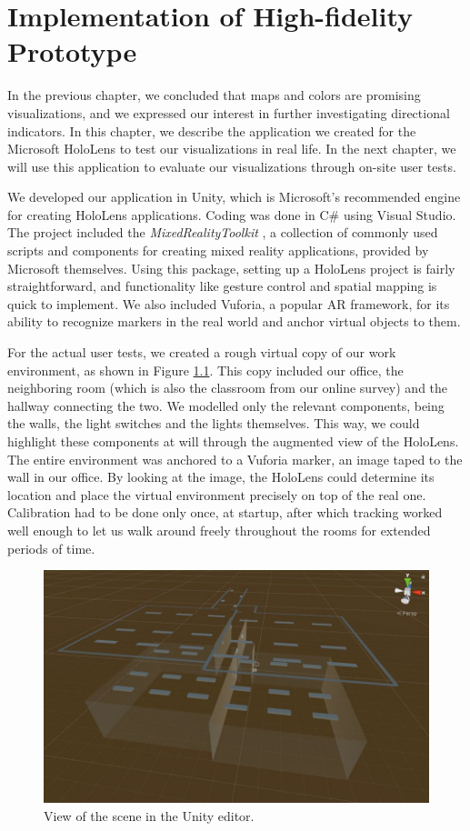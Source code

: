 \chapter{Implementation of High-fidelity Prototype} \label{chap:impl}
In the previous chapter, we concluded that maps and colors are promising visualizations, and we expressed our interest in further investigating directional indicators. In this chapter, we describe the application we created for the Microsoft HoloLens to test our visualizations in real life. In the next chapter, we will use this application to evaluate our visualizations through on-site user tests.



We developed our application in Unity, which is Microsoft's recommended engine for creating HoloLens applications. Coding was done in C\# using Visual Studio. The project included the \textit{MixedRealityToolkit} \cite{Microsof99:online}, a collection of commonly used scripts and components for creating mixed reality applications, provided by Microsoft themselves. Using this package, setting up a HoloLens project is fairly straightforward, and functionality like gesture control and spatial mapping is quick to implement. We also included Vuforia, a popular AR framework, for its ability to recognize markers in the real world and anchor virtual objects to them.

For the actual user tests, we created a rough virtual copy of our work environment, as shown in Figure \ref{fig:model}. This copy included our office, the neighboring room (which is also the classroom from our online survey) and the hallway connecting the two. We modelled only the relevant components, being the walls, the light switches and the lights themselves. This way, we could highlight these components at will through the augmented view of the HoloLens. The entire environment was anchored to a Vuforia marker, an image taped to the wall in our office. By looking at the image, the HoloLens could determine its location and place the virtual environment precisely on top of the real one. Calibration had to be done only once, at startup, after which tracking worked well enough to let us walk around freely throughout the rooms for extended periods of time.

\begin{figure}
    \centering
    \includegraphics[width=0.8\linewidth]{resources/implementation/model.jpg}
    \caption{View of the scene in the Unity editor.}
    \label{fig:model}
\end{figure}

